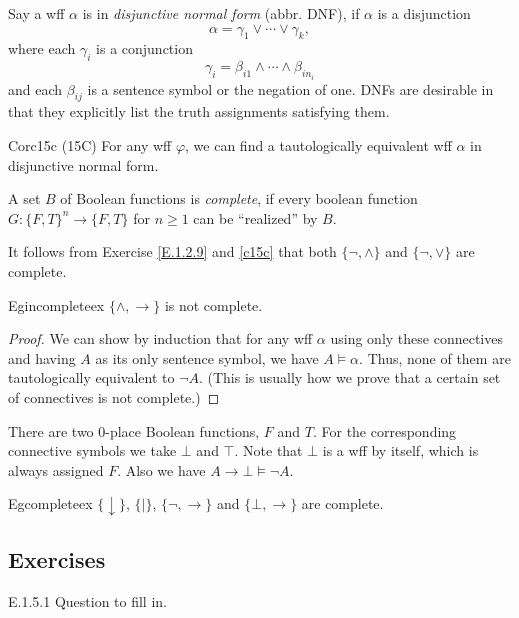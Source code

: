 Say a wff $\alpha$ is in \textit{disjunctive normal form} (abbr. DNF), if $\alpha$ is a disjunction
\[
  \alpha=\gamma_1\vee\cdots\vee \gamma_k,
\]
where each $\gamma_i$ is a conjunction
\[
  \gamma_i=\beta_{i1}\wedge\cdots\wedge \beta_{in_i}
\]
and each $\beta_{ij}$ is a sentence symbol or the negation of one. DNFs are desirable in that they explicitly list the truth assignments satisfying them.

\begin{reference}{Cor}{c15c}
  (15C) For any wff $\varphi$, we can find a tautologically equivalent wff $\alpha$ in disjunctive normal form.
\end{reference}

A set $B$ of Boolean functions is \textit{complete}, if every boolean function $G:\{F,T\}^n\rightarrow\{F,T\}$ for $n\geq 1$ can be ``realized'' by $B$.

It follows from Exercise \ref{E.1.2.9} and \ref{c15c} that both $\{\neg,\wedge\}$ and $\{\neg,\vee\}$ are complete.

\begin{reference}{Eg}{incompleteex}
  $\{\wedge,\rightarrow\}$ is not complete.
\end{reference}

\begin{proof}
  We can show by induction that for any wff $\alpha$ using only these connectives and having $A$ as its only sentence symbol, we have $A\vDash \alpha$. Thus, none of them are tautologically equivalent to $\neg A$. (This is usually how we prove that a certain set of connectives is not complete.)
\end{proof}

There are two $0$-place Boolean functions, $F$ and $T$. For the corresponding connective symbols we take $\bot$ and $\top$. Note that $\bot$ is a wff by itself, which is always assigned $F$. Also we have $A\rightarrow\bot\vDash\neg A$.

\begin{reference}{Eg}{completeex}
  $\{\downarrow\}$, $\{|\}$, $\{\neg,\rightarrow\}$ and $\{\bot,\rightarrow\}$ are complete.
\end{reference}

\subsection*{Exercises}

\begin{exercise}{E.1.5.1}
  Question to fill in.
\end{exercise}

